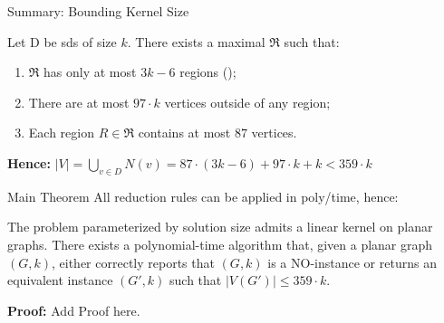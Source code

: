 \begin{frame}[c]{Summary: Bounding Kernel Size}

    Let D be sds of size $k$. There exists a maximal \dreg $\mathfrak{R}$ such that:

    \begin{enumerate}
        \item $\mathfrak{R}$ has only at most $3 k - 6$ regions (\cite{Alber2004});
        \item There are at most $97 \cdot k$ vertices outside of any region;
        \item Each region  $R \in \mathfrak{R}$ contains at most $87$ vertices.
    \end{enumerate}

    \textbf{Hence: } $|V| = \bigcup_{v \in D} N(v) = 87 \cdot (3k - 6) + 97 \cdot k + k < 359 \cdot k$

\end{frame}

\begin{frame}[c]{Main Theorem}
    All reduction rules can be applied in poly/time, hence:

\begin{tcolorbox}[colback=TUMBlueLighter,title=The Main Theorem]
    The \sdom problem parameterized by solution size admits a linear kernel on planar graphs.
    There exists a polynomial-time algorithm that, given a planar graph $(G, k)$, either correctly reports that $(G, k)$ is a NO-instance or returns an equivalent instance $(G', k)$ such that $|V(G')| \leq 359 \cdot k$.
\end{tcolorbox}
\textbf{Proof: } Add Proof here.
\end{frame}

